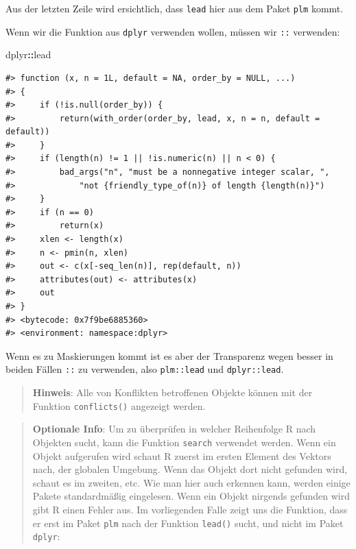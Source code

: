 \documentclass[]{book}
\newenvironment{Shaded}{\begin{snugshade}}{\end{snugshade}}
\newcommand{\OperatorTok}[1]{\textcolor[rgb]{0.81,0.36,0.00}{\textbf{#1}}}
\newcommand{\NormalTok}[1]{#1}
\begin{document}
Aus der letzten Zeile wird ersichtlich, dass \texttt{lead} hier aus dem
Paket \texttt{plm} kommt.

Wenn wir die Funktion aus \texttt{dplyr} verwenden wollen, müssen wir
\texttt{::} verwenden:

\begin{Shaded}
\begin{Highlighting}[]
\NormalTok{dplyr}\OperatorTok{::}\NormalTok{lead}
\end{Highlighting}
\end{Shaded}

\begin{verbatim}
#> function (x, n = 1L, default = NA, order_by = NULL, ...) 
#> {
#>     if (!is.null(order_by)) {
#>         return(with_order(order_by, lead, x, n = n, default = default))
#>     }
#>     if (length(n) != 1 || !is.numeric(n) || n < 0) {
#>         bad_args("n", "must be a nonnegative integer scalar, ", 
#>             "not {friendly_type_of(n)} of length {length(n)}")
#>     }
#>     if (n == 0) 
#>         return(x)
#>     xlen <- length(x)
#>     n <- pmin(n, xlen)
#>     out <- c(x[-seq_len(n)], rep(default, n))
#>     attributes(out) <- attributes(x)
#>     out
#> }
#> <bytecode: 0x7f9be6885360>
#> <environment: namespace:dplyr>
\end{verbatim}

Wenn es zu Maskierungen kommt ist es aber der Transparenz wegen besser
in beiden Fällen \texttt{::} zu verwenden, also \texttt{plm::lead} und
\texttt{dplyr::lead}.

\begin{quote}
\textbf{Hinweis}: Alle von Konflikten betroffenen Objekte können mit der
Funktion \texttt{conflicts()} angezeigt werden.
\end{quote}

\begin{quote}
\textbf{Optionale Info}: Um zu überprüfen in welcher Reihenfolge R nach
Objekten sucht, kann die Funktion \texttt{search} verwendet werden. Wenn
ein Objekt aufgerufen wird schaut R zuerst im ersten Element des Vektors
nach, der globalen Umgebung. Wenn das Objekt dort nicht gefunden wird,
schaut es im zweiten, etc. Wie man hier auch erkennen kann, werden
einige Pakete standardmäßig eingelesen. Wenn ein Objekt nirgends
gefunden wird gibt R einen Fehler aus. Im vorliegenden Falle zeigt uns
die Funktion, dass er erst im Paket \texttt{plm} nach der Funktion
\texttt{lead()} sucht, und nicht im Paket \texttt{dplyr}:
\end{quote}
\end{document}
